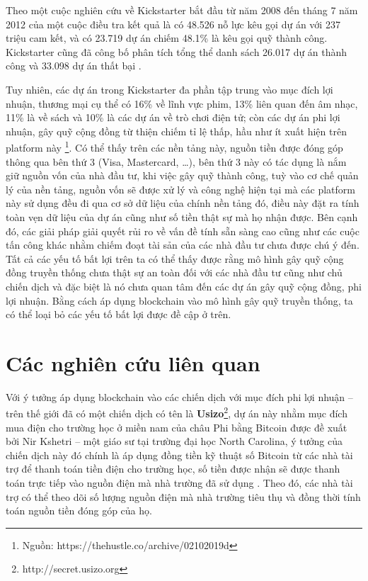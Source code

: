 \documentclass[../main-report.tex]{subfiles}
\begin{document}
Theo một cuộc nghiên cứu về Kickstarter bắt đầu từ năm 2008 đến tháng 7 năm 2012 của một cuộc điều tra kết quả là có 48.526 nỗ lực kêu gọi dự án với 237 triệu cam kết, và có 23.719 dự án chiếm 48.1\% là kêu gọi quỹ thành công. Kickstarter cũng đã công bố phân tích tổng thể danh sách 26.017 dự án thành công và 33.098 dự án thất bại \cite{mollick2014dynamics}.

Tuy nhiên, các dự án trong Kickstarter đa phần tập trung vào mục đích lợi nhuận, thương mại cụ thể có 16\% về lĩnh vực phim, 13\% liên quan đến âm nhạc, 11\% là về sách và 10\% là các dự án về trò chơi điện tử; còn các dự án phi lợi nhuận, gây quỹ cộng đồng từ thiện chiếm tỉ lệ thấp, hầu như ít xuất hiện trên platform này \footnote{Nguồn: https://thehustle.co/archive/02102019d}. Có thể thấy trên các nền tảng này, nguồn tiền được đóng góp thông qua bên thứ 3 (Visa, Mastercard, \ldots), bên thứ 3 này có tác dụng là nắm giữ nguồn vốn của nhà đầu tư, khi việc gây quỹ thành công, tuỳ vào cơ chế quản lý của nền tảng, nguồn vốn sẽ được xử lý và công nghệ hiện tại mà các platform này sử dụng đều đi qua cơ sở dữ liệu của chính nền tảng đó, điều này đặt ra tính toàn vẹn dữ liệu của dự án cũng như số tiền thật sự mà họ nhận được. Bên cạnh đó, các giải pháp giải quyết rủi ro về vấn đề tính sẵn sàng cao cũng như các cuộc tấn công khác nhằm chiếm đoạt tài sản của các nhà đầu tư chưa được chú ý đến. Tất cả các yếu tố bất lợi trên ta có thể thấy được rằng mô hình gây quỹ cộng đồng truyền thống chưa thật sự an toàn đối với các nhà đầu tư cũng như chủ chiến dịch và đặc biệt là nó chưa quan tâm đến các dự án gây quỹ cộng đồng, phi lợi nhuận. Bằng cách áp dụng blockchain vào mô hình gây quỹ truyền thống, ta có thể loại bỏ các yếu tố bất lợi được đề cập ở trên.
\section{Các nghiên cứu liên quan}
\label{sec:related-work}
Với ý tưởng áp dụng \gls{blockchain} vào các chiến dịch với mục đích phi lợi nhuận – trên thế giới đã có một chiến dịch có tên là \textbf{Usizo}\footnote{http://secret.usizo.org}, dự án này nhằm mục đích mua điện cho trường học ở miền nam của châu Phi bằng Bitcoin  được đề xuất bởi Nir Kshetri – một giáo sư tại trường đại học North Carolina, ý tưởng của chiến dịch này đó chính là áp dụng đồng tiền kỹ thuật số Bitcoin từ các nhà tài trợ để thanh toán tiền điện cho trường học, số tiền được nhận sẽ được thanh toán trực tiếp vào nguồn điện mà nhà trường đã sử dụng \cite{goranovic2017blockchain}. Theo đó, các nhà tài trợ có thể theo dõi số lượng nguồn điện mà nhà trường tiêu thụ và đồng thời tính toán nguồn tiền đóng góp của họ.
\end{document}
